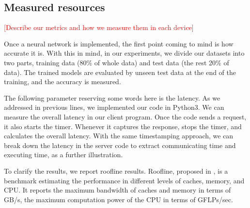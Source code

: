 \subsection{Measured resources}
\textcolor{red}{[Describe our metrics and how we measure them in each device]}

Once a neural network is implemented, the first point coming to mind is how accurate it is. With this in mind, in our experiments, we divide our datasets into two parts, training data (80\% of whole data) and test data (the rest 20\% of data). The trained models are evaluated by unseen test data at the end of the training, and the accuracy is measured.
\par
The following parameter reserving some words here is the latency. As we addressed in previous lines, we implemented our code in Python3. We can measure the overall latency in our client program. Once the code sends a request, it also starts the timer. Whenever it captures the response, stops the timer, and calculates the overall latency. With the same timestamping approach, we can break down the latency in the server code to extract communicating time and executing time, as a further illustration. 
\par
To clarify the results, we report roofline results. Roofline, proposed in \cite{10.1007/978-3-319-17248-4_7}, is a benchmark estimating the performance in different levels of caches, memory, and CPU. It reports the maximum bandwidth of caches and memory in terms of GB/s, the maximum computation power of the CPU in terms of GFLPs/sec.

